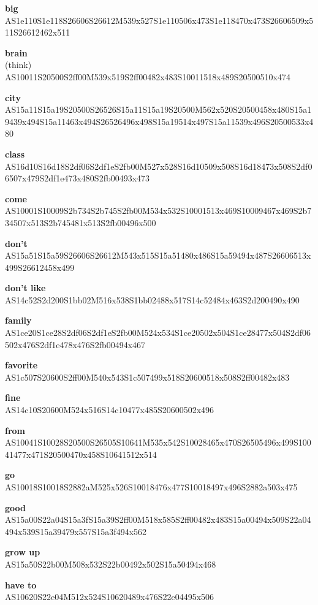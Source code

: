 \documentclass{article}
\begin{document}
\begin{glossary}
\textbf{big}\\
AS1e110S1e118S26606S26612M539x527S1e110506x473S1e118470x473S26606509x511S26612462x511

\textbf{brain}\\(think)
AS10011S20500S2ff00M539x519S2ff00482x483S10011518x489S20500510x474

\textbf{city}\\
AS15a11S15a19S20500S26526S15a11S15a19S20500M562x520S20500458x480S15a19439x494S15a11463x494S26526496x498S15a19514x497S15a11539x496S20500533x480

\textbf{class}\\
AS16d10S16d18S2df06S2df1eS2fb00M527x528S16d10509x508S16d18473x508S2df06507x479S2df1e473x480S2fb00493x473

\textbf{come}\\
AS10001S10009S2b734S2b745S2fb00M534x532S10001513x469S10009467x469S2b734507x513S2b745481x513S2fb00496x500

\textbf{don't}\\
AS15a51S15a59S26606S26612M543x515S15a51480x486S15a59494x487S26606513x499S26612458x499

\textbf{don't like}\\
AS14c52S2d200S1bb02M516x538S1bb02488x517S14c52484x463S2d200490x490

\textbf{family}\\
AS1ce20S1ce28S2df06S2df1eS2fb00M524x534S1ce20502x504S1ce28477x504S2df06502x476S2df1e478x476S2fb00494x467

\textbf{favorite}\\
AS1c507S20600S2ff00M540x543S1c507499x518S20600518x508S2ff00482x483

\textbf{fine}\\
AS14c10S20600M524x516S14c10477x485S20600502x496

\textbf{from}\\
AS10041S10028S20500S26505S10641M535x542S10028465x470S26505496x499S10041477x471S20500470x458S10641512x514

\textbf{go}\\
AS10018S10018S2882aM525x526S10018476x477S10018497x496S2882a503x475

\textbf{good}\\
AS15a00S22a04S15a3fS15a39S2ff00M518x585S2ff00482x483S15a00494x509S22a04494x539S15a39479x557S15a3f494x562

\textbf{grow up}\\
AS15a50S22b00M508x532S22b00492x502S15a50494x468

\textbf{have to}\\
AS10620S22e04M512x524S10620489x476S22e04495x506


\end{glossary}
\end{document}

